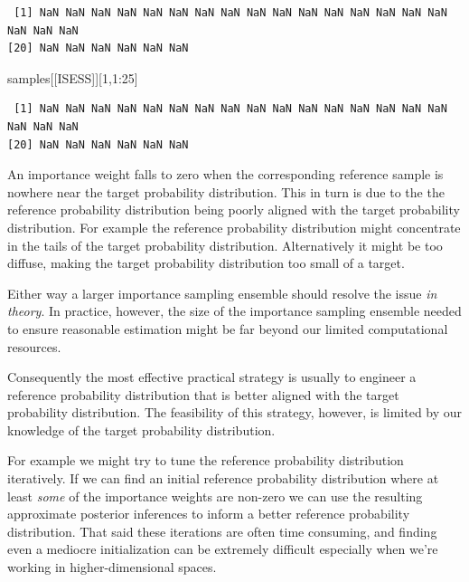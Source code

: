 \documentclass[
  letterpaper,
  DIV=11,
  numbers=noendperiod]{scrartcl}
\newenvironment{Shaded}{\begin{snugshade}}{\end{snugshade}}
\newcommand{\DecValTok}[1]{\textcolor[rgb]{0.68,0.00,0.00}{#1}}
\newcommand{\NormalTok}[1]{\textcolor[rgb]{0.00,0.23,0.31}{#1}}
\newcommand{\SpecialCharTok}[1]{\textcolor[rgb]{0.37,0.37,0.37}{#1}}
\newcommand{\StringTok}[1]{\textcolor[rgb]{0.13,0.47,0.30}{#1}}
\begin{document}
\begin{verbatim}
 [1] NaN NaN NaN NaN NaN NaN NaN NaN NaN NaN NaN NaN NaN NaN NaN NaN NaN NaN NaN
[20] NaN NaN NaN NaN NaN NaN
\end{verbatim}

\begin{Shaded}
\begin{Highlighting}[]
\NormalTok{samples[[}\StringTok{\textquotesingle{}ISESS\textquotesingle{}}\NormalTok{]][}\DecValTok{1}\NormalTok{,}\DecValTok{1}\SpecialCharTok{:}\DecValTok{25}\NormalTok{]}
\end{Highlighting}
\end{Shaded}

\begin{verbatim}
 [1] NaN NaN NaN NaN NaN NaN NaN NaN NaN NaN NaN NaN NaN NaN NaN NaN NaN NaN NaN
[20] NaN NaN NaN NaN NaN NaN
\end{verbatim}

An importance weight falls to zero when the corresponding reference
sample is nowhere near the target probability distribution. This in turn
is due to the the reference probability distribution being poorly
aligned with the target probability distribution. For example the
reference probability distribution might concentrate in the tails of the
target probability distribution. Alternatively it might be too diffuse,
making the target probability distribution too small of a target.

Either way a larger importance sampling ensemble should resolve the
issue \emph{in theory}. In practice, however, the size of the importance
sampling ensemble needed to ensure reasonable estimation might be far
beyond our limited computational resources.

Consequently the most effective practical strategy is usually to
engineer a reference probability distribution that is better aligned
with the target probability distribution. The feasibility of this
strategy, however, is limited by our knowledge of the target probability
distribution.

For example we might try to tune the reference probability distribution
iteratively. If we can find an initial reference probability
distribution where at least \emph{some} of the importance weights are
non-zero we can use the resulting approximate posterior inferences to
inform a better reference probability distribution. That said these
iterations are often time consuming, and finding even a mediocre
initialization can be extremely difficult especially when we're working
in higher-dimensional spaces.
\end{document}
